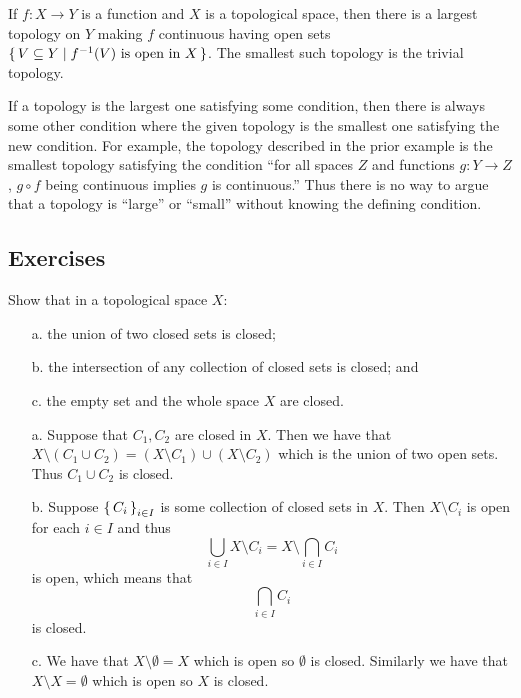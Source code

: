 \documentclass[letterpaper, 11pt, oneside]{book}
\begin{document}
\begin{ex}
  If $f\colon X \to Y$ is a function and $X$ is a topological space, then there is a largest topology on $Y$ making $f$ continuous having open sets $\set{V \subseteq Y | f^{-1}(V) \text{ is open in } X}$.
  The smallest such topology is the trivial topology.
\end{ex}

If a topology is the largest one satisfying some condition, then there is always some other condition where the given topology is the smallest one satisfying the new condition.
For example, the topology described in the prior example is the smallest topology satisfying the condition ``for all spaces $Z$ and functions $g\colon Y \to Z$, $g \circ f$ being continuous implies $g$ is continuous.''
Thus there is no way to argue that a topology is ``large'' or ``small'' without knowing the defining condition.

\clearpage

\subsection*{Exercises}

\begin{exercise}
  Show that in a topological space $X$:
  \begin{enumerate}
  \item[a.] the union of two closed sets is closed;
  \item[b.] the intersection of any collection of closed sets is closed; and
  \item[c.] the empty set and the whole space $X$ are closed.
  \end{enumerate}
\end{exercise}
\begin{pf}
  \begin{enumerate}
  \item[a.] Suppose that $C_{1}, C_{2}$ are closed in $X$.
        Then we have that $X \setminus (C_{1} \cup C_{2}) = (X \setminus C_{1}) \cup (X \setminus C_{2})$ which is the union of two open sets.
        Thus $C_{1} \cup C_{2}$ is closed.
  \item[b.] Suppose $\set{C_{i}}_{i \in I}$ is some collection of closed sets in $X$.
        Then $X \setminus C_{i}$ is open for each $i \in I$ and thus
        \[
          \bigcup_{i \in I} X \setminus C_{i} =  X \setminus \bigcap_{i \in I} C_{i}
        \]
        is open, which means that
        \[
          \bigcap_{i \in I} C_{i}
        \]
        is closed.
  \item[c.] We have that $X \setminus \emptyset = X$ which is open so $\emptyset$ is closed.
        Similarly we have that $X \setminus X = \emptyset$ which is open so $X$ is closed.
  \end{enumerate}
\end{pf}
\end{document}
